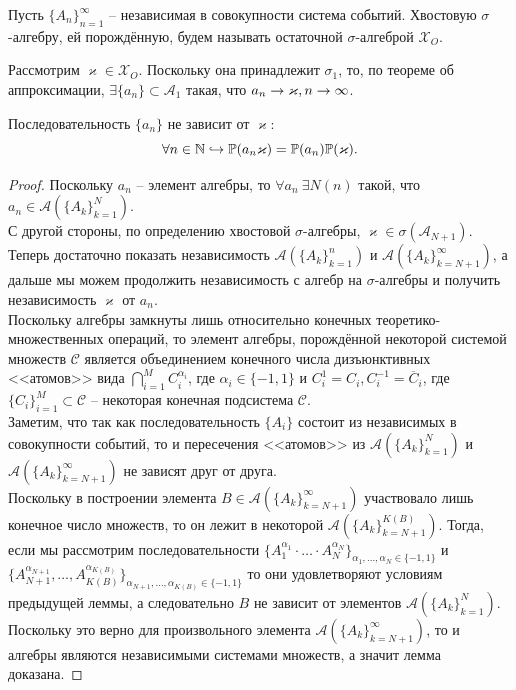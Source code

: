 \begin{definition}
    Пусть $\{A_n\}_{n = 1}^{\infty}$ -- независимая в совокупности система событий. Хвостовую $\sigma$-алгебру, ей порождённую, будем называть остаточной $\sigma$-алгеброй $\mathcal{X}_O$.    
\end{definition}
Рассмотрим $\varkappa \in \mathcal{X}_O$. Поскольку она принадлежит $\sigma_1$, то, по теореме об аппроксимации, $\exists \{a_n\} \subset \mathcal{A}_1$ такая, что $a_n \rightarrow \varkappa, n \rightarrow \infty$.
\begin{lemma}
    Последовательность $\{a_n\}$ не зависит от $\varkappa$:
    \[
        \forall n \in \mathbb{N} \hookrightarrow \mathbb{P}(a_n\varkappa) = \mathbb{P}(a_n)\mathbb{P}(\varkappa).
    \]
\end{lemma}
\begin{proof}
    Поскольку $a_n$ -- элемент алгебры, то $\forall a_n \ \exists N(n)$ такой, что $a_n \in \mathcal{A}(\{A_k\}_{k = 1}^N)$. \\
    С другой стороны, по определению хвостовой $\sigma$-алгебры, $\varkappa \in \sigma(\mathcal{A}_{N + 1})$. \\
    Теперь достаточно показать независимость $\mathcal{A}(\{A_k\}_{k = 1}^{n})$ и $\mathcal{A}(\{A_k\}_{k = N + 1}^\infty)$, а дальше мы можем продолжить независимость с алгебр на $\sigma$-алгебры и получить независимость $\varkappa$ от $a_n$. \\
    Поскольку алгебры замкнуты лишь относительно конечных теоретико-множественных операций, то элемент алгебры, порождённой некоторой системой множеств $\mathcal{C}$ является объединением конечного числа дизъюнктивных <<атомов>> вида $\bigcap\limits_{i = 1}^M C_i^{\alpha_i}$, где $\alpha_i \in \{-1, 1\}$ и $C_i^1 = C_i, C_i^{-1} = \overline{C}_i$, где $\{C_i\}_{i = 1}^M \subset \mathcal{C}$ -- некоторая конечная подсистема $\mathcal{C}$. \\
    Заметим, что так как последовательность $\{A_i\}$ состоит из независимых в совокупности событий, то и пересечения <<атомов>> из $\mathcal{A}(\{A_k\}_{k = 1}^N)$ и $\mathcal{A}(\{A_k\}_{k = N + 1}^\infty)$ не зависят друг от друга. \\
    Поскольку в построении элемента $B \in \mathcal{A}(\{A_k\}_{k = N + 1}^\infty)$ участвовало лишь конечное число множеств, то он лежит в некоторой $\mathcal{A}(\{A_k\}_{k = N + 1}^{K(B)})$.
    Тогда, если мы рассмотрим последовательности $\{A_1^{\alpha_1} \cdot \ldots \cdot A_N^{\alpha_N}\}_{\alpha_1, \ldots, \alpha_N \in \{-1, 1\}}$ и $\{A_{N + 1}^{\alpha_{N+ 1}}, \ldots, A_{K(B)}^{\alpha_{K(B)}}\}_{\alpha_{N+ 1}, \ldots, \alpha_{K(B)} \in \{-1, 1\}}$ то они удовлетворяют условиям предыдущей леммы, а следовательно $B$ не зависит от элементов $\mathcal{A}(\{A_k\}_{k = 1}^{N})$. Поскольку это верно для произвольного элемента $\mathcal{A}(\{A_k\}_{k = N + 1}^{\infty})$, то и алгебры являются независимыми системами множеств, а значит лемма доказана.
\end{proof}
